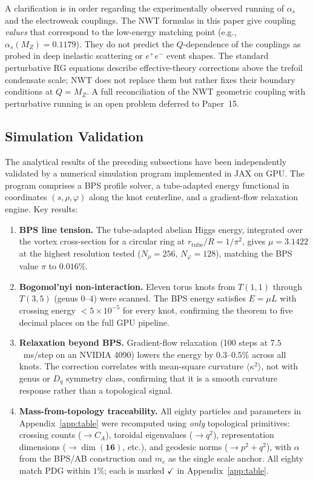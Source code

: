 \documentclass[11pt]{article}
\newcommand{\CA}{C_A}
\begin{document}
A clarification is in order regarding the experimentally observed
running of $\alpha_s$ and the electroweak couplings.  The NWT
formulas in this paper give coupling \emph{values} that correspond
to the low-energy matching point (e.g., $\alpha_s(M_Z) = 0.1179$).
They do not predict the $Q$-dependence of the couplings as probed
in deep inelastic scattering or $e^+e^-$ event shapes.  The
standard perturbative RG equations describe effective-theory
corrections above the trefoil condensate scale; NWT does not
replace them but rather fixes their boundary conditions at
$Q = M_Z$.  A full reconciliation of the NWT geometric coupling
with perturbative running is an open problem deferred to Paper~15.

\subsection{Simulation Validation}
\label{sec:simulation}

The analytical results of the preceding subsections have been
independently validated by a numerical simulation program
implemented in JAX on GPU.  The program comprises a BPS profile
solver, a tube-adapted energy functional in coordinates
$(s, \rho, \varphi)$ along the knot centerline, and a gradient-flow
relaxation engine.  Key results:

\begin{enumerate}
\item \textbf{BPS line tension.}  The tube-adapted abelian Higgs
      energy, integrated over the vortex cross-section for a
      circular ring at $r_\text{tube}/R = 1/\pi^2$, gives
      $\mu = 3.1422$ at the highest resolution tested
      ($N_\rho = 256$, $N_\varphi = 128$), matching the
      BPS value $\pi$ to $0.016\%$.
\item \textbf{Bogomol'nyi non-interaction.}  Eleven torus knots
      from $T(1,1)$ through $T(3,5)$ (genus $0$--$4$) were
      scanned.  The BPS energy satisfies $E = \mu L$ with
      crossing energy $< 5\times 10^{-5}$ for every knot,
      confirming the theorem to five decimal places on the
      full GPU pipeline.
\item \textbf{Relaxation beyond BPS.}  Gradient-flow relaxation
      (100 steps at $7.5$~ms/step on an NVIDIA 4090) lowers the
      energy by $0.3$--$0.5\%$ across all knots.  The correction
      correlates with mean-square curvature $\langle\kappa^2\rangle$,
      not with genus or $D_q$ symmetry class, confirming that it
      is a smooth curvature response rather than a topological
      signal.
\item \textbf{Mass-from-topology traceability.}  All eighty
      particles and parameters in Appendix~\ref{app:table} were
      recomputed using \emph{only} topological primitives:
      crossing counts ($\to\CA$), toroidal eigenvalues ($\to q^2$),
      representation dimensions ($\to\dim(\mathbf{16})$, etc.),
      and geodesic norms ($\to p^2+q^2$), with $\alpha$ from the
      BPS/AB construction and $m_e$ as the single scale anchor.
      All eighty match PDG within $1\%$; each is marked
      $\checkmark$ in Appendix~\ref{app:table}.
\end{enumerate}
\end{document}

